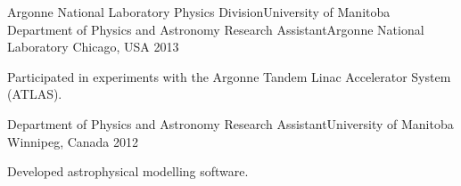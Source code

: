 \begin{cventries}
  \cventry
    {Argonne National Laboratory Physics Division{\enskip\cdotp\enskip}University of Manitoba Department of Physics and Astronomy} %
    {Research Assistant{\enskip\cdotp\enskip}Argonne National Laboratory} %
    {Chicago, USA} %
    {2013} %
    {
      \begin{cvitems} %
        \item {Participated in experiments with the Argonne Tandem Linac Accelerator System (ATLAS).}
      \end{cvitems}
    }
  
    \cventry
    {Department of Physics and Astronomy} %
    {Research Assistant{\enskip\cdotp\enskip}University of Manitoba} %
    {Winnipeg, Canada} %
    {2012} %
    {
      \begin{cvitems} %
        \item {Developed astrophysical modelling software.}
      \end{cvitems}
    }

\end{cventries}
